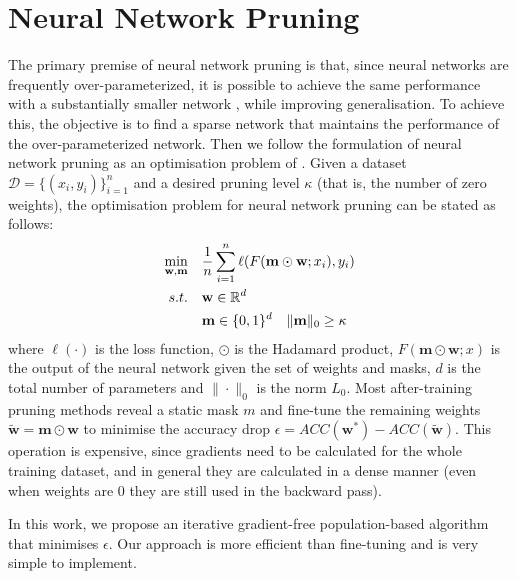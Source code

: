 \documentclass[nohyperref]{article}
\theoremstyle{plain}
\theoremstyle{definition}
\theoremstyle{remark}
\begin{document}

\section{Neural Network Pruning}



The primary premise of neural network pruning is that, since neural networks are frequently over-parameterized, it is possible to achieve the same performance with a substantially smaller network \cite{reedPruningAlgorithmsaSurvey1993}, while improving generalisation.
To achieve this, the objective is to find a sparse network that maintains
the performance of the over-parameterized network. Then we follow the
formulation of neural network pruning as an optimisation problem of
\cite{leeSNIPSINGLESHOTNETWORK2018}. Given a dataset $\mathcal{D}=\{(x_i,y_i)\} _{i=1}^{n}$
and a desired pruning level $\kappa$ (that is, the number of zero weights),
the optimisation problem for neural network pruning can be stated as follows:
\begin{equation}
     \centering
    \begin{aligned}
          \underset{\mathbf{w,m}}{\min}\quad&  \frac{1}{n} \sum_{i=1}^{n}
          \ell(F(\mathbf{m}\odot \textbf{w};x_i),y_i)     \\
    \label{eq:pruning_optim_problem}
           s.t.\quad & \mathbf{w}\in \mathbb{R}^d\\
           \quad & \mathbf{m}\in \{0,1\}^d\quad \|\mathbf{m}\|_0 \geq \kappa
       \end{aligned}
\end{equation}
           where $\ell(\cdot)$ is the loss function, $\odot$ is the
           Hadamard product, $F(\mathbf{m}\odot \textbf{w};x)$ is the output
           of the neural network given the set of weights and masks, $d$ is the total number of
           parameters and $\|\cdot\|_0$ is the norm $L_0$.
Most after-training pruning methods reveal a static mask $m$ and fine-tune the remaining weights $\tilde{\mathbf{w}}=\mathbf{m}
\odot\mathbf{w}$ to minimise the accuracy drop $\epsilon= ACC(\mathbf{w^*})
-ACC(\mathbf{\tilde{w}})$. This operation is expensive, since gradients need to be calculated for
the whole training dataset, and in general they are calculated in a dense
manner (even when weights are 0 they are still used in the backward pass). 



In this work, we propose an iterative gradient-free population-based algorithm
that minimises $\epsilon$. Our approach is more efficient than fine-tuning and
is very simple to implement.
\end{document}
